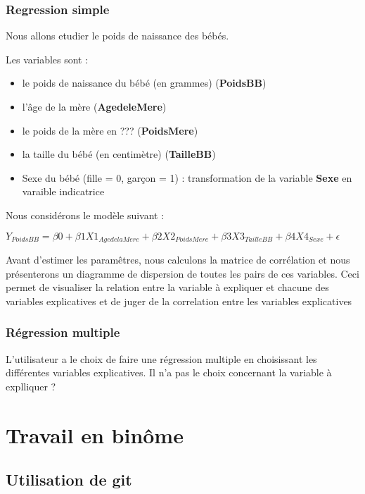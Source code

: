 \documentclass[
]{article}
\begin{document}
\hypertarget{regression-simple}{%
\subsubsection{Regression simple}\label{regression-simple}}

Nous allons etudier le poids de naissance des bébés.

Les variables sont :

\begin{itemize}
\item
  le poids de naissance du bébé (en grammes) (\textbf{PoidsBB})
\item
  l'âge de la mère (\textbf{AgedeleMere})
\item
  le poids de la mère en ??? (\textbf{PoidsMere})
\item
  la taille du bébé (en centimètre) (\textbf{TailleBB})
\item
  Sexe du bébé (fille = 0, garçon = 1) : transformation de la variable
  \textbf{Sexe} en varaible indicatrice
\end{itemize}

Nous considérons le modèle suivant :

\(Y_{PoidsBB} = \beta0 + \beta1 X1_{AgedelaMere} + \beta2 X2_{PoidsMere} + \beta3X3_{TailleBB} + \beta4X4_{Sexe} + \epsilon\)

Avant d'estimer les paramêtres, nous calculons la matrice de corrélation
et nous présenterons un diagramme de dispersion de toutes les pairs de
ces variables. Ceci permet de visualiser la relation entre la variable à
expliquer et chacune des variables explicatives et de juger de la
correlation entre les variables explicatives

\hypertarget{ruxe9gression-multiple}{%
\subsubsection{Régression multiple}\label{ruxe9gression-multiple}}

L'utilisateur a le choix de faire une régression multiple en choisissant
les différentes variables explicatives. Il n'a pas le choix concernant
la variable à explliquer ?

\hypertarget{travail-en-binuxf4me}{%
\section{Travail en binôme}\label{travail-en-binuxf4me}}

\hypertarget{utilisation-de-git}{%
\subsection{Utilisation de git}\label{utilisation-de-git}}
\end{document}
